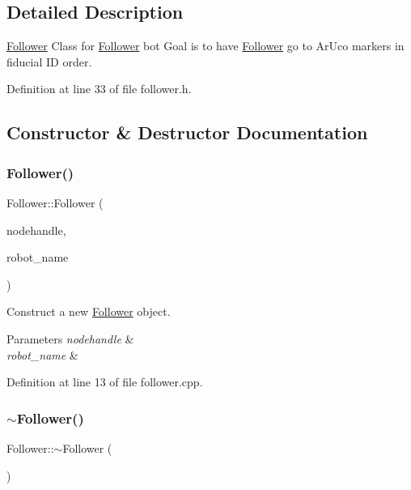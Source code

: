 \subsection{Detailed Description}
\hyperlink{class_follower}{Follower} Class for \hyperlink{class_follower}{Follower} bot Goal is to have \hyperlink{class_follower}{Follower} go to Ar\+Uco markers in fiducial ID order. 

Definition at line 33 of file follower.\+h.



\subsection{Constructor \& Destructor Documentation}
\mbox{\label{class_follower_a6870e654b7cc901944ead12870a6b107}} 
\subsubsection{\texorpdfstring{Follower()}{Follower()}}
{\footnotesize\ttfamily Follower\+::\+Follower (\begin{DoxyParamCaption}\item[{ros\+::\+Node\+Handle $\ast$}]{nodehandle,  }\item[{const std\+::string \&}]{robot\+\_\+name }\end{DoxyParamCaption})}



Construct a new \hyperlink{class_follower}{Follower} object. 


\begin{DoxyParams}{Parameters}
{\em nodehandle} & \\
\hline
{\em robot\+\_\+name} & \\
\hline
\end{DoxyParams}


Definition at line 13 of file follower.\+cpp.

\mbox{\label{class_follower_a1dd55289af5ded7a57a2874c5477c33d}} 
\subsubsection{\texorpdfstring{$\sim$\+Follower()}{~Follower()}}
{\footnotesize\ttfamily Follower\+::$\sim$\+Follower (\begin{DoxyParamCaption}{ }\end{DoxyParamCaption})\hspace{0.3cm}{\ttfamily [inline]}}



